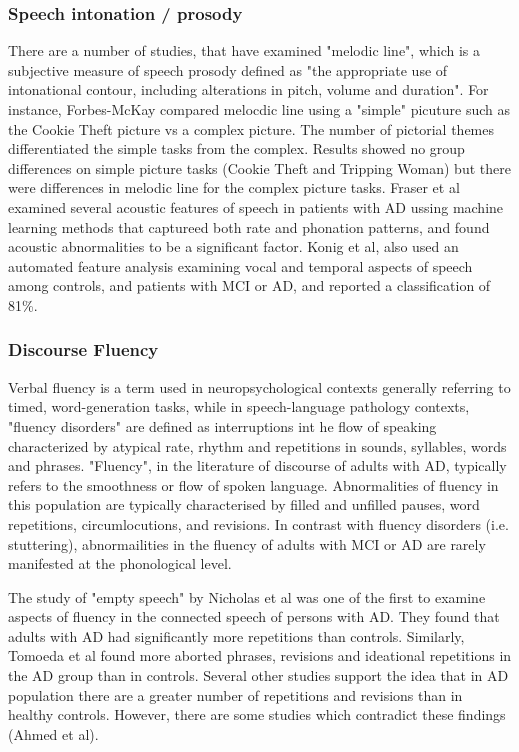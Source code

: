\documentclass{article}
\begin{document}
\subsubsection{Speech intonation / prosody}
There are a number of studies, that have examined "melodic line", which is a subjective measure of speech prosody defined as "the appropriate use of intonational contour, including alterations in pitch, volume and duration". For instance, Forbes-McKay compared melocdic line using a "simple" picuture such as the Cookie Theft picture vs a complex picture. The number of pictorial themes differentiated the simple tasks from the complex. Results showed no group differences on simple picture tasks (Cookie Theft and Tripping Woman) but there were differences in melodic line for the complex picture tasks. Fraser et al examined several acoustic features of speech in patients with AD ussing machine learning methods that captureed both rate and phonation patterns, and found acoustic abnormalities to be a significant factor. Konig et al, also used an automated feature analysis examining vocal and temporal aspects of speech among controls, and patients with MCI or AD, and reported a classification of 81\%.
\subsubsection{Discourse Fluency}
Verbal fluency is a term used in neuropsychological contexts generally referring to timed, word-generation tasks, while in speech-language pathology contexts, "fluency disorders" are defined as interruptions int he flow of speaking characterized by atypical rate, rhythm and repetitions in sounds, syllables, words and phrases. "Fluency", in the literature of discourse of adults with AD, typically refers to the smoothness or flow of spoken language. Abnormalities of fluency in this population are typically characterised by filled and unfilled pauses, word repetitions, circumlocutions, and revisions. In contrast with fluency disorders (i.e. stuttering), abnormailities in the fluency of adults with MCI or AD are rarely manifested at the phonological level.
\par
The study of "empty speech" by Nicholas et al was one of the first to examine aspects of fluency in the connected speech of persons with AD. They found that adults with AD had significantly more repetitions than controls. Similarly, Tomoeda et al found more aborted phrases, revisions and ideational repetitions in the AD group than in controls. Several other studies support the idea that in AD population there are a greater number of repetitions and revisions than in healthy controls. However, there are some studies which contradict these findings (Ahmed et al).
\par
\end{document}
